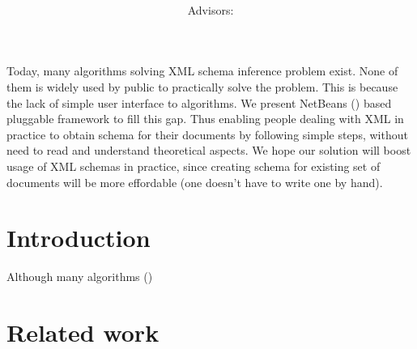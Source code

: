 \documentclass[a4paper,10pt,oneside,twocolumn]{article}
\title{\bf\mftitle}
\author{\mfauthor \\ Advisors: \mfadvisor}
\date{\mfplacedate}
\begin{document}
\maketitle

\abstract
Today, many algorithms solving XML schema inference problem exist.
None of them is widely used by public to practically solve the problem.
This is because the lack of simple user interface to algorithms.
We present NetBeans (\cite{netbeans}) based pluggable framework to fill this gap.
Thus enabling people dealing with XML in practice to obtain schema for their documents by following simple steps, without need to read and understand theoretical aspects.
We hope our solution will boost usage of XML schemas in practice, since creating schema for existing set of documents will be more effordable (one doesn't have to write one by hand).

\section*{Introduction}
Although many algorithms (\cite{ahonen, Bex:2006:ICD:1182635.1164139, Bex:2007:IXS:1325851.1325964, 1802522, vyhnanovska}) 

\section*{Related work}

\newpage


\end{document}

